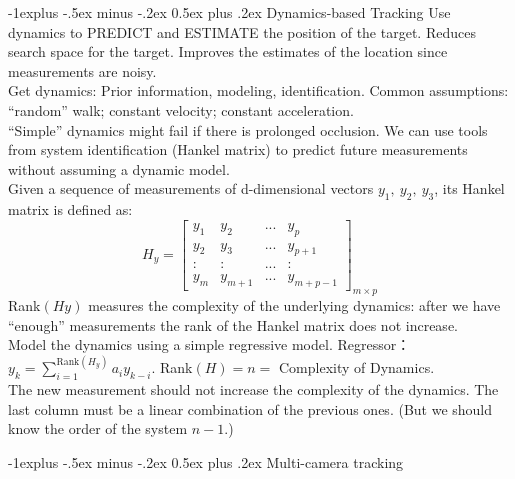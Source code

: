 \documentclass[10pt,landscape]{article}
\makeatletter
\renewcommand{\subsection}{\@startsection{subsection}{2}{0mm}%
                                {-1explus -.5ex minus -.2ex}%
                                {0.5ex plus .2ex}%
                                {\normalfont\normalsize\bfseries}}
\makeatother
\begin{document}
\begin{multicols}{3}
\subsection{Dynamics-based Tracking}
Use dynamics to PREDICT and ESTIMATE the position of the target. Reduces search space for the target. Improves the estimates of the location since measurements are noisy.\\
Get dynamics: Prior information, modeling, identification. Common assumptions: “random” walk; constant velocity; constant acceleration.\\
“Simple” dynamics might fail if there is prolonged occlusion. We can use tools from system identification (Hankel matrix) to predict future measurements without assuming a dynamic model.\\
Given a sequence of measurements of d-dimensional vectors $y_1,\ y_2,\ y_3$, its Hankel matrix is defined as:
\begin{equation*}
    H_y = \left [\begin{array}{cccc}
        y_1 & y_2 & ... & y_p\\
        y_2 & y_3 & ... & y_{p+1}\\
        : & : & ... & :\\
        y_m & y_{m+1} & ... & y_{m+p-1}
    \end{array} \right ] _{m\times p}
\end{equation*}
Rank$(Hy)$ measures the complexity of the underlying
dynamics: after we have “enough” measurements the rank of the Hankel matrix does not increase.\\
Model the dynamics using a simple regressive model. Regressor：$y_k = \sum^{\text{Rank}(H_y)}_{i=1} a_iy_{k-i}$. Rank$(H) = n = $ Complexity of Dynamics.\\
The new measurement should not increase the complexity of the dynamics. The last column must be a linear combination of the previous ones. (But we should know the order of the system $n-1$.)


\subsection{Multi-camera tracking}










\end{multicols}
\end{document}
